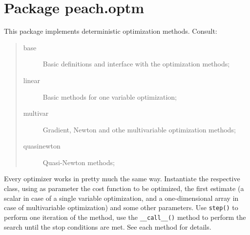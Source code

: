%
%
%


\section{Package peach.optm}

    \label{peach:optm}

This package implements deterministic optimization methods. Consult:
%
\begin{quote}
%
\begin{description}
\item[{base}] \leavevmode 
Basic definitions and interface with the optimization methods;

\item[{linear}] \leavevmode 
Basic methods for one variable optimization;

\item[{multivar}] \leavevmode 
Gradient, Newton and othe multivariable optimization methods;

\item[{quasinewton}] \leavevmode 
Quasi-Newton methods;

\end{description}

\end{quote}

Every optimizer works in pretty much the same way. Instantiate the respective
class, using as parameter the cost function to be optimized, the first estimate
(a scalar in case of a single variable optimization, and a one-dimensional array
in case of multivariable optimization) and some other parameters. Use \texttt{step()}
to perform one iteration of the method, use the \texttt{\_\_call\_\_()} method to perform
the search until the stop conditions are met. See each method for details.



